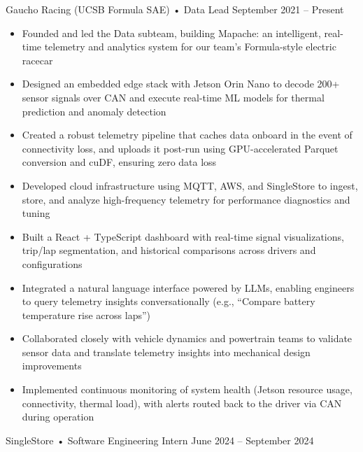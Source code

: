 \documentclass[9pt]{developercv} %
\begin{document}
\begin{entrylist}
    \entry
        {}
        {Gaucho Racing (UCSB Formula SAE) • Data Lead}
        {September 2021 – Present}
        {\vspace{-8pt}
        \begin{itemize}[noitemsep,topsep=0pt,parsep=0pt,partopsep=0pt, leftmargin=10pt]
            \item Founded and led the Data subteam, building Mapache: an intelligent, real-time telemetry and analytics system for our team's Formula-style electric racecar
            \item Designed an embedded edge stack with Jetson Orin Nano to decode 200+ sensor signals over CAN and execute real-time ML models for thermal prediction and anomaly detection
            \item Created a robust telemetry pipeline that caches data onboard in the event of connectivity loss, and uploads it post-run using GPU-accelerated Parquet conversion and cuDF, ensuring zero data loss
            \item Developed cloud infrastructure using MQTT, AWS, and SingleStore to ingest, store, and analyze high-frequency telemetry for performance diagnostics and tuning
            \item Built a React + TypeScript dashboard with real-time signal visualizations, trip/lap segmentation, and historical comparisons across drivers and configurations
            \item Integrated a natural language interface powered by LLMs, enabling engineers to query telemetry insights conversationally (e.g., “Compare battery temperature rise across laps”)
            \item Collaborated closely with vehicle dynamics and powertrain teams to validate sensor data and translate telemetry insights into mechanical design improvements
            \item Implemented continuous monitoring of system health (Jetson resource usage, connectivity, thermal load), with alerts routed back to the driver via CAN during operation
        \end{itemize}}
	\entry
        {}
		{SingleStore • Software Engineering Intern}
		{June 2024 – September 2024}
		{\vspace{-8pt}
        \begin{itemize}[noitemsep,topsep=0pt,parsep=0pt,partopsep=0pt, leftmargin=10pt]

\end{itemize}}
\end{entrylist}
\end{document}
